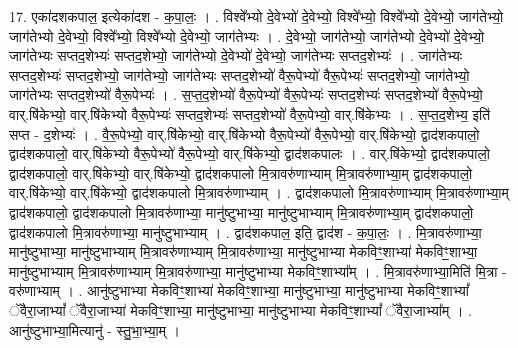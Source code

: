 \documentclass[17pt]{extarticle}
\begin{document}
17. एका॑दशकपाल॒ इत्येका॑दश - क॒पा॒लः॒ । . विश्वे᳚भ्यो दे॒वेभ्यो॑ दे॒वेभ्यो॒ विश्वे᳚भ्यो॒ विश्वे᳚भ्यो दे॒वेभ्यो॒ जाग॑तेभ्यो॒ जाग॑तेभ्यो दे॒वेभ्यो॒ विश्वे᳚भ्यो॒ विश्वे᳚भ्यो दे॒वेभ्यो॒ जाग॑तेभ्यः । . दे॒वेभ्यो॒ जाग॑तेभ्यो॒ जाग॑तेभ्यो दे॒वेभ्यो॑ दे॒वेभ्यो॒ जाग॑तेभ्यः सप्तद॒शेभ्यः॑ सप्तद॒शेभ्यो॒ जाग॑तेभ्यो दे॒वेभ्यो॑ दे॒वेभ्यो॒ जाग॑तेभ्यः सप्तद॒शेभ्यः॑ । . जाग॑तेभ्यः सप्तद॒शेभ्यः॑ सप्तद॒शेभ्यो॒ जाग॑तेभ्यो॒ जाग॑तेभ्यः सप्तद॒शेभ्यो॑ वैरू॒पेभ्यो॑ वैरू॒पेभ्यः॑ सप्तद॒शेभ्यो॒ जाग॑तेभ्यो॒ जाग॑तेभ्यः सप्तद॒शेभ्यो॑ वैरू॒पेभ्यः॑ । . स॒प्त॒द॒शेभ्यो॑ वैरू॒पेभ्यो॑ वैरू॒पेभ्यः॑ सप्तद॒शेभ्यः॑ सप्तद॒शेभ्यो॑ वैरू॒पेभ्यो॒ वार्.षि॑केभ्यो॒ वार्.षि॑केभ्यो वैरू॒पेभ्यः॑ सप्तद॒शेभ्यः॑ सप्तद॒शेभ्यो॑ वैरू॒पेभ्यो॒ वार्.षि॑केभ्यः । . स॒प्त॒द॒शेभ्य॒ इति॑ सप्त - द॒शेभ्यः॑ । . वै॒रू॒पेभ्यो॒ वार्.षि॑केभ्यो॒ वार्.षि॑केभ्यो वैरू॒पेभ्यो॑ वैरू॒पेभ्यो॒ वार्.षि॑केभ्यो॒ द्वाद॑शकपालो॒ द्वाद॑शकपालो॒ वार्.षि॑केभ्यो वैरू॒पेभ्यो॑ वैरू॒पेभ्यो॒ वार्.षि॑केभ्यो॒ द्वाद॑शकपालः । . वार्.षि॑केभ्यो॒ द्वाद॑शकपालो॒ द्वाद॑शकपालो॒ वार्.षि॑केभ्यो॒ वार्.षि॑केभ्यो॒ द्वाद॑शकपालो मि॒त्रावरु॑णाभ्याम् मि॒त्रावरु॑णाभ्या॒म् द्वाद॑शकपालो॒ वार्.षि॑केभ्यो॒ वार्.षि॑केभ्यो॒ द्वाद॑शकपालो मि॒त्रावरु॑णाभ्याम् । . द्वाद॑शकपालो मि॒त्रावरु॑णाभ्याम् मि॒त्रावरु॑णाभ्या॒म् द्वाद॑शकपालो॒ द्वाद॑शकपालो मि॒त्रावरु॑णाभ्या॒ मानु॑ष्टुभाभ्या॒ मानु॑ष्टुभाभ्याम् मि॒त्रावरु॑णाभ्या॒म् द्वाद॑शकपालो॒ द्वाद॑शकपालो मि॒त्रावरु॑णाभ्या॒ मानु॑ष्टुभाभ्याम् । . द्वाद॑शकपाल॒ इति॒ द्वाद॑श - क॒पा॒लः॒ । . मि॒त्रावरु॑णाभ्या॒ मानु॑ष्टुभाभ्या॒ मानु॑ष्टुभाभ्याम् मि॒त्रावरु॑णाभ्याम् मि॒त्रावरु॑णाभ्या॒ मानु॑ष्टुभाभ्या मेकविꣳ॒॒शाभ्या॑ मेकविꣳ॒॒शाभ्या॒ मानु॑ष्टुभाभ्याम् मि॒त्रावरु॑णाभ्याम् मि॒त्रावरु॑णाभ्या॒ मानु॑ष्टुभाभ्या मेकविꣳ॒॒शाभ्या᳚म् । . मि॒त्रावरु॑णाभ्या॒मिति॑ मि॒त्रा - वरु॑णाभ्याम् । . आनु॑ष्टुभाभ्या मेकविꣳ॒॒शाभ्या॑ मेकविꣳ॒॒शाभ्या॒ मानु॑ष्टुभाभ्या॒ मानु॑ष्टुभाभ्या मेकविꣳ॒॒शाभ्यां᳚ ॅवैरा॒जाभ्यां᳚ ॅवैरा॒जाभ्या॑ मेकविꣳ॒॒शाभ्या॒ मानु॑ष्टुभाभ्या॒ मानु॑ष्टुभाभ्या मेकविꣳ॒॒शाभ्यां᳚ ॅवैरा॒जाभ्या᳚म् । . आनु॑ष्टुभाभ्या॒मित्यानु॑ - स्तु॒भा॒भ्या॒म् । \newline
\end{document}
